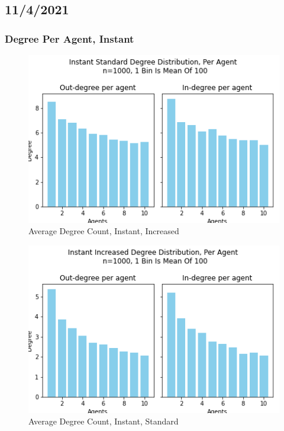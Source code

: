 \documentclass{article}
\begin{document}
\subsection*{11/4/2021}
\subsubsection{Degree Per Agent, Instant}
\begin{center}
    \begin{figure}[!htbp]
        \centering
        \includegraphics[width=.8\textwidth]{ThesisKI/Images/IncreasedPerAgentInstant.png}
        \caption{Average Degree Count, Instant, Increased}
        \label{DPA:InsInc}
    \end{figure}
\end{center}
\begin{center}
    \begin{figure}[!htbp]
        \centering
        \includegraphics[width=.8\textwidth]{ThesisKI/Images/StandardPerAgentInstant.png}
        \caption{Average Degree Count, Instant, Standard}
        \label{DPA:InsStd}
    \end{figure}
\end{center}
\newpage
\end{document}
